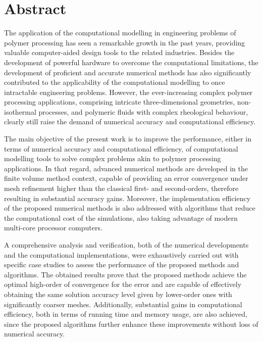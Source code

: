 
\chapter*{Abstract}

The application of the computational modelling in engineering problems of polymer processing has seen a remarkable growth in the past years, providing valuable computer-aided design tools to the related industries.
Besides the development of powerful hardware to overcome the computational limitations, the development of proficient and accurate numerical methods has also significantly contributed to the applicability of the computational modelling to once intractable engineering problems.
However, the ever-increasing complex polymer processing applications, comprising intricate three-dimensional geometries, non-isothermal processes, and polymeric fluids with complex rheological behaviour, clearly still raise the demand of numerical accuracy and computational efficiency.

The main objective of the present work is to improve the performance, either in terms of numerical accuracy and computational efficiency, of computational modelling tools to solve complex problems akin to polymer processing applications.
In that regard, advanced numerical methods are developed in the finite volume method context, capable of providing an error convergence under mesh refinement higher than the classical first- and second-orders, therefore resulting in substantial accuracy gains.
Moreover, the implementation efficiency of the proposed numerical methods is also addressed with algorithms that reduce the computational cost of the simulations, also taking advantage of modern multi-core processor computers.

A comprehensive analysis and verification, both of the numerical developments and the computational implementations, were exhaustively carried out with specific case studies to assess the performance of the proposed methods and algorithms.
The obtained results prove that the proposed methods achieve the optimal high-order of convergence for the error and are capable of effectively obtaining the same solution accuracy level given by lower-order ones with significantly coarser meshes.
Additionally, substantial gains in computational efficiency, both in terms of running time and memory usage, are also achieved, since the proposed algorithms further enhance these improvements without loss of numerical accuracy.

